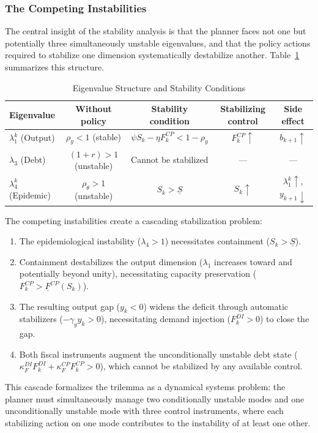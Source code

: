 \documentclass[12pt, a4paper]{article}
\begin{document}
\subsubsection{The Competing Instabilities}

The central insight of the stability analysis is that the planner faces not one but
potentially three simultaneously unstable eigenvalues, and that the policy actions
required to stabilize one dimension systematically destabilize another. Table~\ref{tab:stability}
summarizes this structure.

\begin{table}[h]
\centering
\caption{Eigenvalue Structure and Stability Conditions}
\label{tab:stability}
\small
\begin{tabular}{@{}lcccc@{}}
\toprule
Eigenvalue & Without policy & Stability condition & Stabilizing control & Side effect \\
\midrule
$\lambda_1^k$ (Output)
  & $\rho_y < 1$ (stable)
  & $\psi S_k - \eta F_k^{CP} < 1 - \rho_y$
  & $F_k^{CP} \uparrow$
  & $b_{k+1} \uparrow$ \\[6pt]
$\lambda_3$ (Debt)
  & $(1+r) > 1$ (unstable)
  & Cannot be stabilized
  & ---
  & --- \\[6pt]
$\lambda_4^k$ (Epidemic)
  & $\rho_\theta > 1$ (unstable)
  & $S_k > \underline{S}$
  & $S_k \uparrow$
  & $\lambda_1^k \uparrow$, $y_{k+1} \downarrow$ \\
\bottomrule
\end{tabular}
\end{table}

The competing instabilities create a cascading stabilization problem:
%
\begin{enumerate}
    \item The epidemiological instability ($\lambda_4 > 1$) necessitates containment
    ($S_k > \underline{S}$).

    \item Containment destabilizes the output dimension ($\lambda_1$ increases toward
    and potentially beyond unity), necessitating capacity preservation ($F_k^{CP} >
    \underline{F}^{CP}(S_k)$).

    \item The resulting output gap ($y_k < 0$) widens the deficit through automatic
    stabilizers ($-\gamma_y y_k > 0$), necessitating demand injection ($F_k^{DI} > 0$)
    to close the gap.

    \item Both fiscal instruments augment the unconditionally unstable debt state
    ($\kappa_F^{DI} F_k^{DI} + \kappa_F^{CP} F_k^{CP} > 0$), which cannot be
    stabilized by any available control.
\end{enumerate}
%
This cascade formalizes the trilemma as a dynamical systems problem: the planner must
simultaneously manage two conditionally unstable modes and one unconditionally unstable
mode with three control instruments, where each stabilizing action on one mode
contributes to the instability of at least one other.
\end{document}
